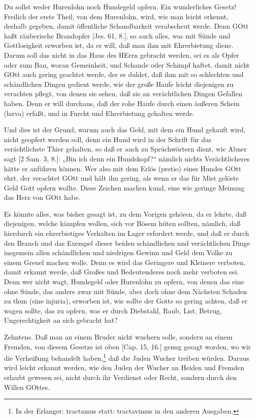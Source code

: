 Du sollst weder Hurenlohn noch Hundegeld opfern. Ein wunderliches Gesetz! Freilich der erste Theil, von dem Hurenlohn, wird, wie man leicht erkennt, deshalb gegeben, damit öffentliche Schandbarkeit verabscheut werde. Denn GOtt haßt räuberische Brandopfer [Jes. 61, 8.], so auch alles, was mit Sünde und Gottlosigkeit erworben ist, da er will, daß man ihm mit Ehrerbietung diene. Darum soll das nicht in das Haus des HErrn gebracht werden, sei es als Opfer oder zum Bau, woran Gemeinheit, und Schande oder Schimpf haftet, damit nicht GOtt auch gering geachtet werde, der es duldet, daß ihm mit so schlechten und schändlichen Dingen gedient werde, wie der große Haufe leicht diejenigen zu verachten pflegt, von denen sie sehen, daß sie an verächtlichen Dingen Gefallen haben. Denn er will durchaus, daß der rohe Haufe durch einen äußeren Schein (larva) erfaßt, und in Furcht und Ehrerbietung gehalten werde.

Und dies ist der Grund, warum auch das Geld, mit dem ein Hund gekauft wird, nicht geopfert werden soll, denn ein Hund wird in der Schrift für das verächtlichste Thier gehalten, so daß er auch zu Sprüchwörtern dient, wie Abner sagt [2 Sam. 3, 8.]: „Bin ich denn ein Hundskopf?“ nämlich nichts Verächtlicheres hätte er anführen können. Wer also mit dem Erlös (pretio) eines Hundes GOtt ehrt, der verachtet GOtt und hält ihn gering, als wenn er das für Mist gelöste Geld Gott opfern wollte. Diese Zeichen machen kund, eine wie geringe Meinung das Herz von GOtt habe.

Es könnte alles, was bisher gesagt ist, zu dem Vorigen gehören, da er lehrte, daß diejenigen, welche kämpfen wollen, sich vor Bösem hüten sollten, nämlich, daß hierdurch ein ehrerbietiges Verhalten im Lager erfordert werde, und daß er durch den Brauch und das Exempel dieser beiden schändlichen und verächtlichen Dinge insgemein allen schändlichen und niedrigen Gewinn
und Geld dem Volke zu einem Greuel machen wolle. Denn es wird das Geringere und Kleinere verboten, damit erkannt werde, daß Großes und Bedeutenderes noch mehr verboten sei. Denn wer nicht wagt, Hundegeld oder Hurenlohn zu opfern, von denen das eine ohne Sünde, das andere zwar mit Sünde, aber doch ohne dem Nächsten Schaden zu thun (sine injuria), erworben ist, wie sollte der Gotte so gering achten, daß er wagen sollte, das zu opfern, was er durch Diebstahl, Raub, List, Betrug, Ungerechtigkeit an sich gebracht hat?

Zehntens. Daß man an einem Bruder nicht wuchern solle, sondern an einem Fremden, von diesem Gesetze ist oben [Cap. 15, 16.] genug gesagt worden, wo wir die Verheißung behandelt haben,\footnote{In der Erlanger: tractamus statt: tractavimus in den anderen Ausgaben.} daß die Juden Wucher treiben würden. Daraus wird leicht erkannt werden, wie den Juden der Wucher an Heiden und Fremden erlaubt gewesen sei, nicht durch ihr Verdienst oder Recht, sondern durch den Willen GOttes.

